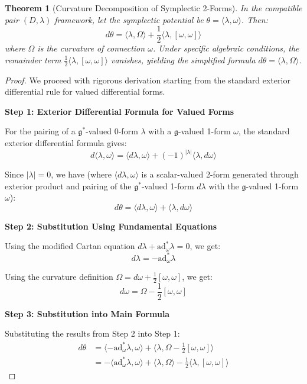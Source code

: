 \documentclass[a4paper,12pt]{extarticle}
\newtheorem{theorem}{Theorem}
\theoremstyle{definition}
\begin{document}
\begin{theorem}[Curvature Decomposition of Symplectic 2-Forms]
In the compatible pair $(D, \lambda)$ framework, let the symplectic potential be $\theta = \langle\lambda, \omega\rangle$. Then:
$$d\theta = \langle\lambda, \Omega\rangle + \frac{1}{2}\langle\lambda, [\omega, \omega]\rangle$$
where $\Omega$ is the curvature of connection $\omega$. Under specific algebraic conditions, the remainder term $\frac{1}{2}\langle\lambda, [\omega, \omega]\rangle$ vanishes, yielding the simplified formula $d\theta = \langle\lambda, \Omega\rangle$.
\end{theorem}

\begin{proof}
We proceed with rigorous derivation starting from the standard exterior differential rule for valued differential forms.

\textbf{Step 1: Exterior Differential Formula for Valued Forms}

For the pairing of a $\mathfrak{g}^*$-valued 0-form $\lambda$ with a $\mathfrak{g}$-valued 1-form $\omega$, the standard exterior differential formula gives:
$$d\langle\lambda, \omega\rangle = \langle d\lambda, \omega\rangle + (-1)^{|\lambda|}\langle\lambda, d\omega\rangle$$

Since $|\lambda| = 0$, we have (where $\langle d\lambda, \omega\rangle$ is a scalar-valued 2-form generated through exterior product and pairing of the $\mathfrak{g}^*$-valued 1-form $d\lambda$ with the $\mathfrak{g}$-valued 1-form $\omega$):
$$d\theta = \langle d\lambda, \omega\rangle + \langle\lambda, d\omega\rangle$$

\textbf{Step 2: Substitution Using Fundamental Equations}

Using the modified Cartan equation $d\lambda + \text{ad}_\omega^* \lambda = 0$, we get:
$$d\lambda = -\text{ad}_\omega^* \lambda$$

Using the curvature definition $\Omega = d\omega + \frac{1}{2}[\omega, \omega]$, we get:
$$d\omega = \Omega - \frac{1}{2}[\omega, \omega]$$

\textbf{Step 3: Substitution into Main Formula}

Substituting the results from Step 2 into Step 1:
\begin{align}
d\theta &= \langle -\text{ad}_\omega^* \lambda, \omega\rangle + \langle\lambda, \Omega - \frac{1}{2}[\omega, \omega]\rangle \\
&= -\langle\text{ad}_\omega^* \lambda, \omega\rangle + \langle\lambda, \Omega\rangle - \frac{1}{2}\langle\lambda, [\omega, \omega]\rangle
\end{align}


\end{proof}
\end{document}

